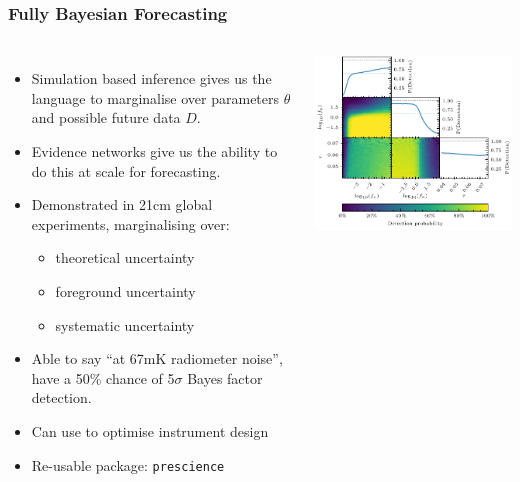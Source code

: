 \documentclass[aspectratio=169]{beamer}
\begin{document}
\begin{frame}
    \frametitle{Fully Bayesian Forecasting~}
    \begin{columns}
        \begin{itemize}
            \item Simulation based inference gives us the language to marginalise over parameters $\theta$ and possible future data $D$.
            \item Evidence networks give us the ability to do this at scale for forecasting.
            \item Demonstrated in 21cm global experiments, marginalising over:
                \begin{itemize}
                    \item theoretical uncertainty
                    \item foreground uncertainty
                    \item systematic uncertainty
                \end{itemize}
            \item Able to say ``at 67mK radiometer noise'', have a 50\% chance of 5$\sigma$ Bayes factor detection.
            \item Can use to optimise instrument design
            \item Re-usable package: \texttt{prescience}
        \end{itemize}
        \includegraphics[width=\textwidth]{figures/fbf.pdf}
    \end{columns}
\end{frame}
\end{document}
